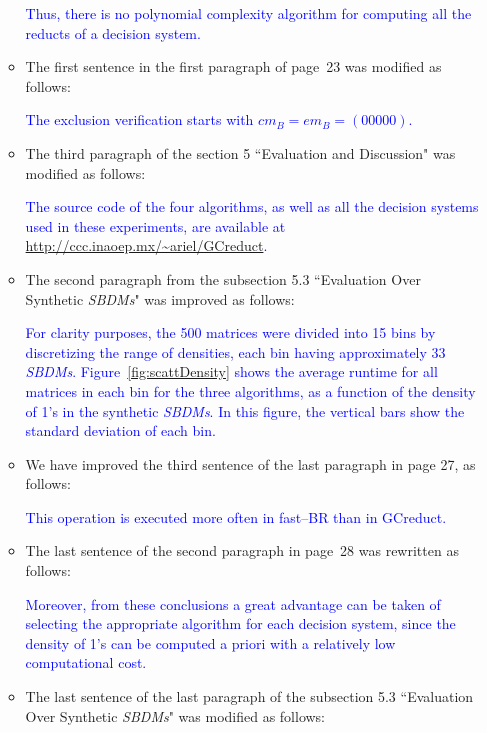 \documentclass{letter}
\begin{document}
\begin{letter}{}
\begin{enumerate}
\begin{itemize}
		\textcolor{blue}{Thus, there is no polynomial complexity algorithm for computing all the reducts of a decision system.}%
		
		\item The first sentence in the first paragraph of page~23 was modified as follows:
		
		\textcolor{blue}{The exclusion verification starts with $cm_B = em_B = (00000)$.}
		
		\item The third paragraph of the section 5 ``Evaluation and Discussion" was modified as follows:
		
		\textcolor{blue}{The source code of the four algorithms, as well as all the decision systems used in these experiments, are available at \url{http://ccc.inaoep.mx/~ariel/GCreduct}.}
		
		\item The second paragraph from the subsection 5.3 ``Evaluation Over Synthetic \textit{SBDMs}" was improved as follows:
		
		\textcolor{blue}{For clarity purposes, the 500 matrices were divided into 15 bins by discretizing the range of densities, each bin having approximately 33 \textit{SBDMs}. Figure~\ref{fig:scattDensity} shows the average runtime for all  matrices in each bin for the three algorithms, as a function of the density of 1's in the synthetic \textit{SBDMs}. In this figure, the vertical bars show the standard deviation of each bin.}
		
		\item We have improved the third sentence of the last paragraph in page 27, as follows:
		
		\textcolor{blue}{This operation is executed more often in fast--BR than in GCreduct.}
		
		\item The last sentence of the second paragraph in page~28 was rewritten as follows:
		
		\textcolor{blue}{Moreover, from these conclusions a great advantage can be taken of selecting the appropriate algorithm for each decision system, since the density of 1's can be computed a priori with a relatively low computational cost.}
		
		\item The last sentence of the last paragraph of the subsection 5.3 ``Evaluation Over Synthetic \textit{SBDMs}" was modified as follows:
		

\end{itemize}
\end{enumerate}
\end{letter}
\end{document}
